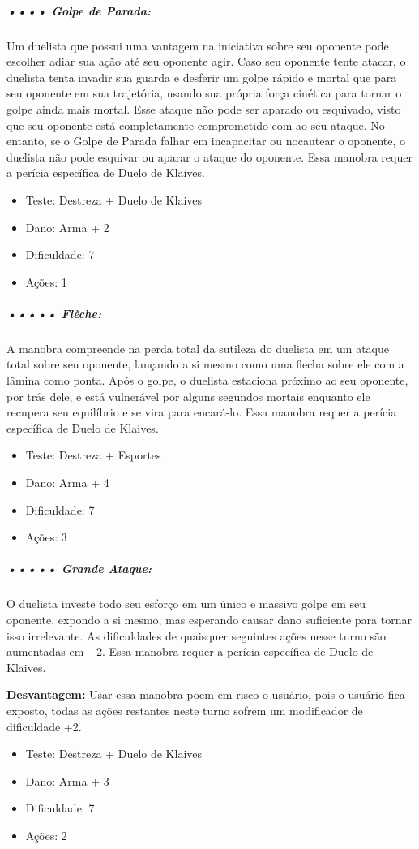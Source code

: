 \subparagraph{\bf •••• Golpe de Parada:}
Um duelista que possui uma vantagem na iniciativa sobre seu oponente pode escolher adiar sua ação até seu oponente agir. Caso seu oponente tente atacar, o duelista tenta invadir sua guarda e desferir um golpe rápido e mortal que para seu oponente em sua trajetória, usando sua própria força cinética para tornar o golpe ainda mais mortal. Esse ataque não pode ser aparado ou esquivado, visto que seu oponente está completamente comprometido com ao seu ataque. No entanto, se o Golpe de Parada falhar em incapacitar ou nocautear o oponente, o duelista não pode esquivar ou aparar o ataque do oponente. Essa manobra requer a perícia específica de Duelo de Klaives.
\begin{itemize}[noitemsep]
\item Teste: Destreza + Duelo de Klaives
\item Dano: Arma + 2
\item Dificuldade: 7 
\item Ações: 1
\end{itemize}

\subparagraph{\bf ••••• Flèche:}
A manobra compreende na perda total da sutileza do duelista em um ataque total sobre seu oponente, lançando a si mesmo como uma flecha sobre ele com a lâmina como ponta. Após o golpe, o duelista estaciona próximo ao seu oponente, por trás dele, e está vulnerável por alguns segundos mortais enquanto ele recupera seu equilíbrio e se vira para encará-lo. Essa manobra requer a perícia específica de Duelo de Klaives.
\begin{itemize}[noitemsep]
\item Teste: Destreza + Esportes
\item Dano: Arma + 4
\item Dificuldade: 7 
\item Ações: 3
\end{itemize}

\subparagraph{\bf ••••• Grande Ataque:}
O duelista investe todo seu esforço em um único e massivo golpe em seu oponente, expondo a si mesmo, mas esperando causar dano suficiente para tornar isso irrelevante. As dificuldades de quaisquer seguintes ações nesse turno são aumentadas em +2. Essa manobra requer a perícia específica de Duelo de Klaives.

{\bf Desvantagem:} Usar essa manobra poem em risco o usuário, pois o usuário fica exposto, todas as ações restantes neste turno sofrem um modificador de dificuldade +2.

\begin{itemize}[noitemsep]
\item Teste: Destreza + Duelo de Klaives
\item Dano: Arma + 3
\item Dificuldade: 7 
\item Ações: 2
\end{itemize}